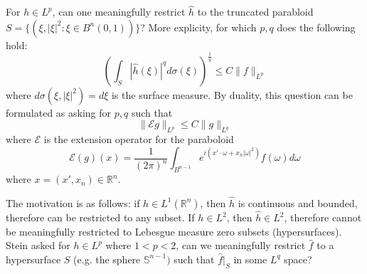 \documentclass[openany]{book}
\newcommand{\R}{\mathbb{R}}
\begin{document}
\begin{prob}
    For $h\in L^p$, can one meaningfully restrict $\hat{h}$ to the truncated parabloid $S=\{(\xi,|\xi|^2:\xi\in B^n(0,1))\}$? More explicity, for which $p,q$ does the following hold:
    \begin{equation*}
        \left(\int_S|\hat{h}(\xi)|^qd\sigma(\xi)\right)^\frac{1}{q}\leq C\|f\|_{L^p}
    \end{equation*}
    where $d\sigma(\xi, |\xi|^2)=d\xi$ is the surface measure. By duality, this question can be formulated as asking for $p,q$ such that 
    \begin{equation*}
        \|\mathcal{E}g\|_{L^p}\leq C\|g\|_{L^q}
    \end{equation*}
    where $\mathcal{E}$ is the extension 
    operator for the paraboloid
    \begin{equation*}
        \mathcal{E}(g)(x)=\frac{1}{(2\pi)^n}\int_{B^{n-1}}e^{i(x'\cdot\omega+x_n|\omega|^2)}f(\omega)d\omega
    \end{equation*}
    where $x=(x',x_n)\in\R^n$.
\end{prob}
The motivation is as follows: if $h\in L^1(\R^n)$, then $\hat{h}$ is continuous and bounded, therefore can be restricted to any subset.  If $h\in L^2$, then $\hat{h}\in L^2$, therefore cannot be meaningfully restricted to Lebesgue measure zero subsets (hypersurfaces). Stein asked for $h\in L^p$ where $1<p<2$, can we meaningfully restrict $\hat{f}$ to a hypersurface $S$ (e.g. the sphere $\mathbb{S}^{n-1})$ such that $\hat{f}\vert_S$ in some $L^q$ space?
\end{document}
